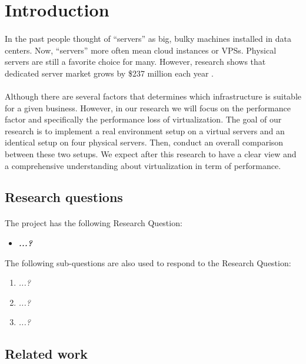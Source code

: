 \section{Introduction}
\paragraph{}
In the past people thought of “servers” as big, bulky machines installed in data centers. Now, “servers” more often mean cloud instances or VPSs. Physical servers are still a favorite choice for many. However, research shows that dedicated server market grows by \$237 million each year \cite{c1}. 
\paragraph{}
Although there are several factors that determines which infrastructure is suitable for a given business. However, in our research we will focus on the performance factor and specifically the performance loss of virtualization. The goal of our research is to implement a real environment setup on a virtual servers and an identical setup on four physical servers. Then, conduct an overall comparison between these two setups. We expect after this research to have a clear view and a comprehensive understanding about virtualization in term of performance. 
\subsection{Research questions}
\paragraph{}
The project has the following Research Question:
\begin{itemize}
    \item \textbf{\textit{...?}}
\end{itemize}
The following sub-questions are also used to respond to the Research Question:
\begin{enumerate}
    \item \textit{...?}
    \item \textit{...?}
    \item \textit{...?}
\end{enumerate}
\subsection{Related work}
\paragraph{}